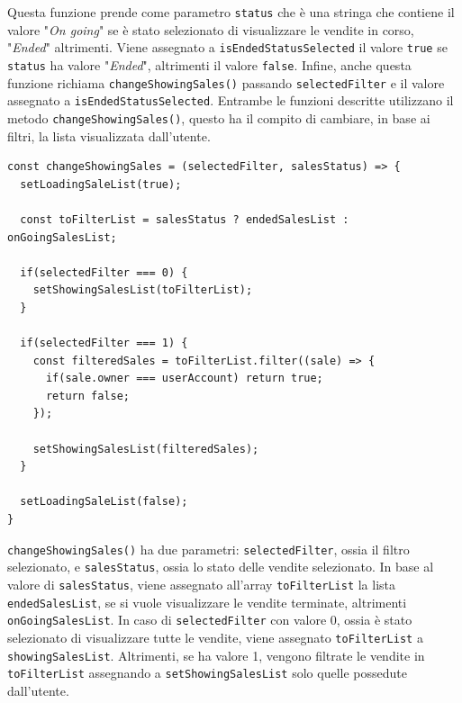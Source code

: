 \documentclass[a4paper]{article}
\begin{document}
        Questa funzione prende come parametro \verb|status| che è una stringa che contiene il valore "\emph{On going}" se è stato selezionato di visualizzare le vendite in corso, "\emph{Ended}" altrimenti.
        Viene assegnato a \verb|isEndedStatusSelected| il valore \verb|true| se \verb|status| ha valore "\emph{Ended}", altrimenti il valore \verb|false|. Infine, anche questa funzione richiama \verb|changeShowingSales()| passando
        \verb|selectedFilter| e il valore assegnato a \verb|isEndedStatusSelected|.
        Entrambe le funzioni descritte utilizzano il metodo \verb|changeShowingSales()|, questo ha il compito di cambiare, in base ai filtri, la lista visualizzata dall'utente.
\begin{lstlisting}[style=ES6, title={Funzione changeShowingSales()}]
const changeShowingSales = (selectedFilter, salesStatus) => {
  setLoadingSaleList(true);

  const toFilterList = salesStatus ? endedSalesList : onGoingSalesList;

  if(selectedFilter === 0) {
    setShowingSalesList(toFilterList);
  }

  if(selectedFilter === 1) {
    const filteredSales = toFilterList.filter((sale) => {
      if(sale.owner === userAccount) return true;
      return false;
    });

    setShowingSalesList(filteredSales);
  }

  setLoadingSaleList(false);
}\end{lstlisting}
        \verb|changeShowingSales()| ha due parametri: \verb|selectedFilter|, ossia il filtro selezionato, e \verb|salesStatus|, ossia lo stato delle vendite selezionato.
        In base al valore di \verb|salesStatus|, viene assegnato all'array \verb|toFilterList| la lista \verb|endedSalesList|, se si vuole visualizzare le vendite terminate, altrimenti \verb|onGoingSalesList|.
        In caso di \verb|selectedFilter| con valore 0, ossia è stato selezionato di visualizzare tutte le vendite, viene assegnato \verb|toFilterList| a \verb|showingSalesList|. Altrimenti, se ha valore 1, vengono filtrate le vendite in \verb|toFilterList|
        assegnando a \verb|setShowingSalesList| solo quelle possedute dall'utente.
\end{document}

